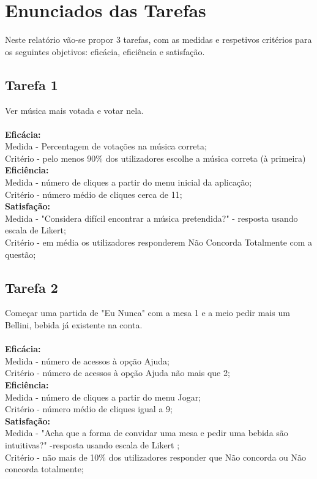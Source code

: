 \documentclass{article}
\begin{document}
\section*{Enunciados das Tarefas}
Neste relatório vão-se propor 3 tarefas, com as medidas e respetivos critérios para os seguintes objetivos: eficácia, eficiência e satisfação.

\subsection*{Tarefa 1}
Ver música mais votada e votar nela.\\\\
\textbf{Eficácia:}\\
Medida - Percentagem de votações na música correta;\\
Critério - pelo menos 90\% dos utilizadores escolhe a música correta (à primeira)\\
\textbf{Eficiência:} \\
Medida - número de cliques a partir do menu inicial da aplicação;\\
Critério - número médio de cliques cerca de 11;\\
\textbf{Satisfação:}\\
Medida - "Considera difícil encontrar a música pretendida?" - resposta usando escala de Likert;\\
Critério - em média os utilizadores responderem Não Concorda Totalmente com a questão;

\subsection*{Tarefa 2}
Começar uma partida de "Eu Nunca" com a mesa 1 e a meio pedir mais um Bellini, bebida já existente na conta.\\\\
\textbf{Eficácia:}\\
Medida - número de acessos à opção Ajuda;\\
Critério - número de acessos à opção Ajuda não mais que 2;\\
\textbf{Eficiência:}\\
Medida - número de cliques a partir do menu Jogar;\\
Critério - número médio de cliques igual a 9;\\
\textbf{Satisfação:}\\
Medida - "Acha que a forma de convidar uma mesa e pedir uma bebida são intuitivas?" -resposta usando escala de Likert ;\\
Critério - não mais de 10\% dos utilizadores responder que Não concorda ou Não concorda totalmente;
\end{document}
